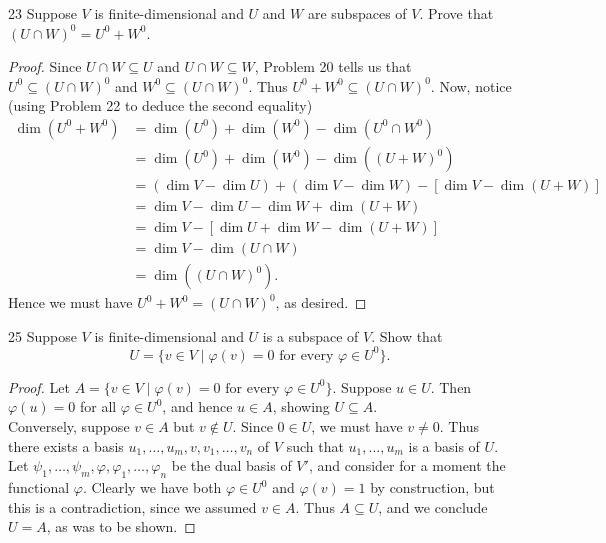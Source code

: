 \documentclass[11pt]{extarticle}
\newenvironment{problem}[1]{\begin{prob*}{#1}{}}{\end{prob*}}
\begin{document}
\begin{problem}{23}
Suppose $V$ is finite-dimensional and $U$ and $W$ are subspaces of $V$.  Prove that $(U\cap W)^0 = U^0 + W^0$.  
\end{problem}
\begin{proof}
Since $U\cap W\subseteq U$ and $U\cap W \subseteq W$, Problem 20 tells us that $U^0\subseteq (U\cap W)^0$ and $W^0\subseteq (U\cap W)^0$.  Thus $U^0 + W^0\subseteq (U\cap W)^0$.  Now, notice (using Problem 22 to deduce the second equality)
\begin{align*}
\dim(U^0 + W^0) &= \dim(U^0) + \dim(W^0) - \dim(U^0\cap W^0)\\
&= \dim(U^0) + \dim(W^0) - \dim((U+W)^0)\\
&= (\dim V - \dim U) + (\dim V - \dim W) - [\dim V - \dim(U + W)]\\
&= \dim V - \dim U - \dim W + \dim(U + W)\\
&= \dim V - [\dim U + \dim W - \dim(U+W)]\\
&= \dim V - \dim (U\cap W)\\
&= \dim((U\cap W)^0).
\end{align*}
Hence we must have $U^0 + W^0 = (U\cap W)^0$, as desired.
\end{proof}

\begin{problem}{25}
Suppose $V$ is finite-dimensional and $U$ is a subspace of $V$.  Show that
\begin{equation*}
U = \{v\in V\mid \varphi(v) = 0\text{ for every }\varphi\in U^0\}.
\end{equation*}
\end{problem}
\begin{proof}
Let $A = \{v\in V\mid \varphi(v) = 0\text{ for every }\varphi\in U^0\}$.  Suppose $u\in U$.  Then $\varphi(u) = 0$ for all $\varphi\in U^0$, and hence $u\in A$, showing $U \subseteq A$.\\
\indent Conversely, suppose $v \in A$ but $v \not\in U$.  Since $0\in U$, we must have $v \neq 0$. Thus there exists a basis $u_1,\dots,u_m, v, v_1,\dots, v_n$ of $V$ such that $u_1,\dots, u_m$ is a basis of $U$.  Let $\psi_1,\dots,\psi_m, \varphi, \varphi_1,\dots, \varphi_n$ be the dual basis of $V'$, and consider for a moment the functional $\varphi$.  Clearly we have both $\varphi\in U^0$ and $\varphi(v) = 1$ by construction, but this is a contradiction, since we assumed $v\in A$.  Thus $A\subseteq U$, and we conclude $U = A$, as was to be shown. 
\end{proof}
\end{document}
